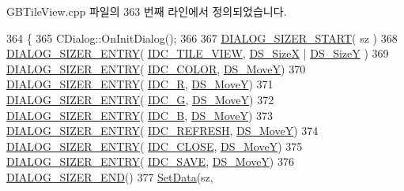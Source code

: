 G\+B\+Tile\+View.\+cpp 파일의 363 번째 라인에서 정의되었습니다.


\begin{DoxyCode}
364 \{
365   CDialog::OnInitDialog();
366   
367   \mbox{\hyperlink{_resize_dlg_8h_acb9d1d22d9838f6dda8a61cfa132997c}{DIALOG\_SIZER\_START}}( sz )
368     \mbox{\hyperlink{_resize_dlg_8h_a0e9ee7a18c54003893895a009f5d79c8}{DIALOG\_SIZER\_ENTRY}}( \mbox{\hyperlink{resource_8h_a091df1e8af92b702472240d05fafd9cc}{IDC\_TILE\_VIEW}}, \mbox{\hyperlink{_resize_dlg_8h_a21713fd373c62604a1ee3d5d831101ad}{DS\_SizeX}} | 
      \mbox{\hyperlink{_resize_dlg_8h_a783821ba6bb984916d55f46cdf90cb2b}{DS\_SizeY}} )
369     \mbox{\hyperlink{_resize_dlg_8h_a0e9ee7a18c54003893895a009f5d79c8}{DIALOG\_SIZER\_ENTRY}}( \mbox{\hyperlink{resource_8h_a611975b03b6d7ce68b2de260b97086d0}{IDC\_COLOR}}, \mbox{\hyperlink{_resize_dlg_8h_ae5309071be822a4dae5cb33a131f6180}{DS\_MoveY}})
370     \mbox{\hyperlink{_resize_dlg_8h_a0e9ee7a18c54003893895a009f5d79c8}{DIALOG\_SIZER\_ENTRY}}( \mbox{\hyperlink{resource_8h_ab801af70383175ec71fd14d356bf9c9d}{IDC\_R}}, \mbox{\hyperlink{_resize_dlg_8h_ae5309071be822a4dae5cb33a131f6180}{DS\_MoveY}})
371     \mbox{\hyperlink{_resize_dlg_8h_a0e9ee7a18c54003893895a009f5d79c8}{DIALOG\_SIZER\_ENTRY}}( \mbox{\hyperlink{resource_8h_a35ca279082796c6a98895939aa06826d}{IDC\_G}}, \mbox{\hyperlink{_resize_dlg_8h_ae5309071be822a4dae5cb33a131f6180}{DS\_MoveY}})
372     \mbox{\hyperlink{_resize_dlg_8h_a0e9ee7a18c54003893895a009f5d79c8}{DIALOG\_SIZER\_ENTRY}}( \mbox{\hyperlink{resource_8h_a96306052e53348b1e760b8dcabf2b0c7}{IDC\_B}}, \mbox{\hyperlink{_resize_dlg_8h_ae5309071be822a4dae5cb33a131f6180}{DS\_MoveY}})
373     \mbox{\hyperlink{_resize_dlg_8h_a0e9ee7a18c54003893895a009f5d79c8}{DIALOG\_SIZER\_ENTRY}}( \mbox{\hyperlink{resource_8h_ab2f366ad34063a7be9de1e2249dc705a}{IDC\_REFRESH}}, \mbox{\hyperlink{_resize_dlg_8h_ae5309071be822a4dae5cb33a131f6180}{DS\_MoveY}})
374     \mbox{\hyperlink{_resize_dlg_8h_a0e9ee7a18c54003893895a009f5d79c8}{DIALOG\_SIZER\_ENTRY}}( \mbox{\hyperlink{resource_8h_a27e7224faecfa4040c695a69107088f9}{IDC\_CLOSE}}, \mbox{\hyperlink{_resize_dlg_8h_ae5309071be822a4dae5cb33a131f6180}{DS\_MoveY}})
375     \mbox{\hyperlink{_resize_dlg_8h_a0e9ee7a18c54003893895a009f5d79c8}{DIALOG\_SIZER\_ENTRY}}( \mbox{\hyperlink{resource_8h_a305f8d6fb810f32b99a97396ac92f9d5}{IDC\_SAVE}}, \mbox{\hyperlink{_resize_dlg_8h_ae5309071be822a4dae5cb33a131f6180}{DS\_MoveY}})
376     \mbox{\hyperlink{_resize_dlg_8h_aeac0c1e32f30e0763df5736e4b3ea50a}{DIALOG\_SIZER\_END}}()
377     \mbox{\hyperlink{class_resize_dlg_a6a3965f44a0c2f5ba9aaa798a9a81df5}{SetData}}(sz,

\end{DoxyCode}
